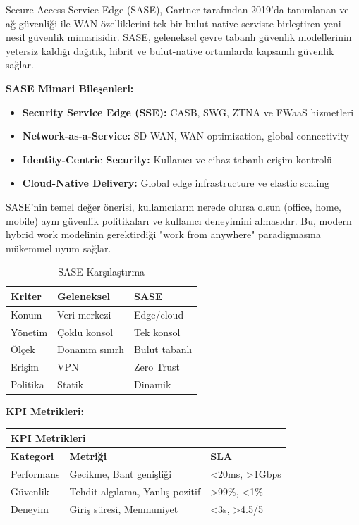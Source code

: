 Secure Access Service Edge (SASE), Gartner tarafından 2019'da tanımlanan ve ağ güvenliği ile WAN özelliklerini tek bir bulut-native serviste birleştiren yeni nesil güvenlik mimarisidir. SASE, geleneksel çevre tabanlı güvenlik modellerinin yetersiz kaldığı dağıtık, hibrit ve bulut-native ortamlarda kapsamlı güvenlik sağlar.

\textbf{SASE Mimari Bileşenleri:}
\begin{itemize}
    \item \textbf{Security Service Edge (SSE):} CASB, SWG, ZTNA ve FWaaS hizmetleri
    \item \textbf{Network-as-a-Service:} SD-WAN, WAN optimization, global connectivity
    \item \textbf{Identity-Centric Security:} Kullanıcı ve cihaz tabanlı erişim kontrolü
    \item \textbf{Cloud-Native Delivery:} Global edge infrastructure ve elastic scaling
\end{itemize}

SASE'nin temel değer önerisi, kullanıcıların nerede olursa olsun (office, home, mobile) aynı güvenlik politikaları ve kullanıcı deneyimini almasıdır. Bu, modern hybrid work modelinin gerektirdiği "work from anywhere" paradigmasına mükemmel uyum sağlar.

\begin{table}[H]
\centering
\caption*{SASE Karşılaştırma}
\small
\begin{tabular}{|p{4cm}|p{6cm}|p{4cm}|}
\hline
\hline
\textbf{Kriter} & \textbf{Geleneksel} & \textbf{SASE} \\
\hline
\hline
Konum & Veri merkezi & Edge/cloud \\
\hline
\hline
Yönetim & Çoklu konsol & Tek konsol \\
\hline
\hline
Ölçek & Donanım sınırlı & Bulut tabanlı \\
\hline
\hline
Erişim & VPN & Zero Trust \\
\hline
\hline
Politika & Statik & Dinamik \\
\hline
\hline
\hline
\end{tabular}
\end{table}

\noindent\textbf{KPI Metrikleri:}

\begin{tabular}{|p{4cm}|p{6cm}|p{4cm}|}
\hline
\hline
\multicolumn{3}{|C{2cm}|}{\textbf{KPI Metrikleri}} \\
\hline
\textbf{Kategori} & \textbf{Metriği} & \textbf{SLA}  \\
\hline
\hline
Performans & Gecikme, Bant genişliği & <20ms, >1Gbps  \\
\hline
\hline
Güvenlik & Tehdit algılama, Yanlış pozitif & >99\%, <1\%  \\
\hline
\hline
Deneyim & Giriş süresi, Memnuniyet & <3s, >4.5/5  \\
\hline
\hline
\hline
\end{tabular}


